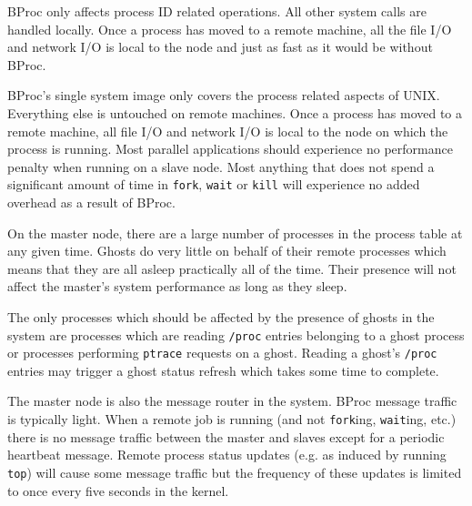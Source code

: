 
BProc only affects process ID related operations.  All other system
calls are handled locally.  Once a process has moved to a remote
machine, all the file I/O and network I/O is local to the node and
just as fast as it would be without BProc.

BProc's single system image only covers the process related aspects of
UNIX.  Everything else is untouched on remote machines.  Once a
process has moved to a remote machine, all file I/O and network I/O is
local to the node on which the process is running.  Most parallel
applications should experience no performance penalty when running on
a slave node.  Most anything that does not spend a significant amount
of time in \texttt{fork}, \texttt{wait} or \texttt{kill} will
experience no added overhead as a result of BProc.


On the master node, there are a large number of processes in the
process table at any given time.  Ghosts do very little on behalf of
their remote processes which means that they are all asleep
practically all of the time.  Their presence will not affect the
master's system performance as long as they sleep.

The only processes which should be affected by the presence of ghosts
in the system are processes which are reading \texttt{/proc} entries
belonging to a ghost process or processes performing \texttt{ptrace}
requests on a ghost.  Reading a ghost's \texttt{/proc} entries may
trigger a ghost status refresh which takes some time to complete.


The master node is also the message router in the system.  BProc
message traffic is typically light.  When a remote job is running (and
not \texttt{fork}ing, \texttt{wait}ing, etc.) there is no message
traffic between the master and slaves except for a periodic heartbeat
message.  Remote process status updates (e.g. as induced by running
\texttt{top}) will cause some message traffic but the frequency of
these updates is limited to once every five seconds in the kernel.


